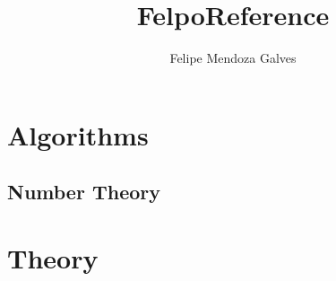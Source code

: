 \documentclass[10pt]{article}
\title{FelpoReference}
\author{Felipe Mendoza Galves}
\date{}
\begin{document}
	
	\maketitle
	\newpage
	\tableofcontents
	\newpage
	
	\section{Algorithms}
		\subsection{Number Theory}		
					
	\section{Theory}
	
	
	
	
\end{document}
